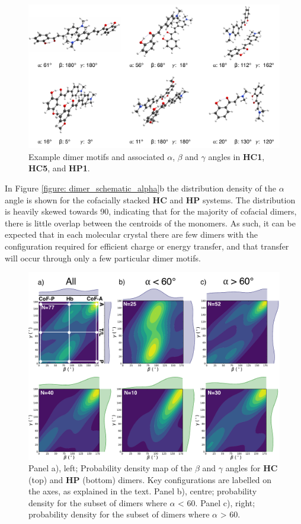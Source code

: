 \begin{figure}[t]
\centering
  \includegraphics[width=0.9\linewidth]{5ConnectingCrystalStructure/motif_examples}
  \caption[Example dimer motifs in \textbf{HC1}, \textbf{HC5}, and \textbf{HP1}.]{Example dimer motifs and associated $\alpha$, $\beta$ and $\gamma$ angles in \textbf{HC1}, \textbf{HC5}, and \textbf{HP1}.}
  \label{figure: motif_examples}
\end{figure}

In Figure \ref{figure: dimer_schematic_alpha}b the distribution density of the $\alpha$ angle is shown for the cofacially stacked \textbf{HC} and \textbf{HP} systems. The distribution is heavily skewed towards 90\degree, indicating that for the majority of cofacial dimers, there is little overlap between the centroids of the monomers. As such, it can be expected that in each molecular crystal there are few dimers with the configuration required for efficient charge or energy transfer, and that transfer will occur through only a few particular dimer motifs. 
\begin{figure}[t]
\centering
  \includegraphics[width=0.9\linewidth]{5ConnectingCrystalStructure/dimer_classification}
  \caption[Probability density maps of $\beta$ and $\gamma$ angles.]{Panel a), left; Probability density map of the $\beta$ and $\gamma$ angles for \textbf{HC} (top) and \textbf{HP} (bottom) dimers. Key configurations are labelled on the axes, as explained in the text. Panel b), centre; probability density for the subset of dimers where $\alpha$ \textless{}  60\degree{}.  Panel c), right; probability density for the subset of dimers where $\alpha$ \textgreater{} 60\degree{}.}
  \label{figure: dimer_classification}
\end{figure}

